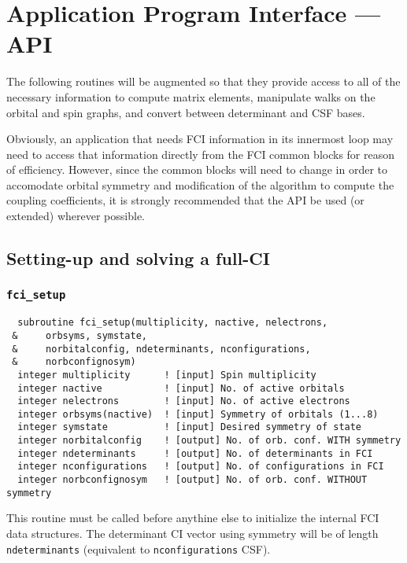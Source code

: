 \documentclass[fullpage,12pt,fleqn]{article}
\begin{document}
\section{Application Program Interface --- API}

The following routines will be augmented so that they provide access
to all of the necessary information to compute matrix elements,
manipulate walks on the orbital and spin graphs, and convert between
determinant and CSF bases. 

Obviously, an application that needs FCI information in its innermost
loop may need to access that information directly from the FCI common
blocks for reason of efficiency.  However, since the common blocks
will need to change in order to accomodate orbital symmetry and
modification of the algorithm to compute the coupling coefficients, it
is strongly recommended that the API be used (or extended) wherever
possible.

\subsection{Setting-up and solving a full-CI}

\subsubsection{{\tt fci\_setup}}

\begin{verbatim}
  subroutine fci_setup(multiplicity, nactive, nelectrons,
 &     orbsyms, symstate,
 &     norbitalconfig, ndeterminants, nconfigurations,
 &     norbconfignosym)
  integer multiplicity      ! [input] Spin multiplicity
  integer nactive           ! [input] No. of active orbitals
  integer nelectrons        ! [input] No. of active electrons
  integer orbsyms(nactive)  ! [input] Symmetry of orbitals (1...8)
  integer symstate          ! [input] Desired symmetry of state
  integer norbitalconfig    ! [output] No. of orb. conf. WITH symmetry
  integer ndeterminants     ! [output] No. of determinants in FCI
  integer nconfigurations   ! [output] No. of configurations in FCI
  integer norbconfignosym   ! [output] No. of orb. conf. WITHOUT symmetry
\end{verbatim}
This routine must be called before anythine else to initialize the
internal FCI data structures.  The determinant CI vector using
symmetry will be of length \verb!ndeterminants! (equivalent to
\verb!nconfigurations! CSF).
\end{document}
